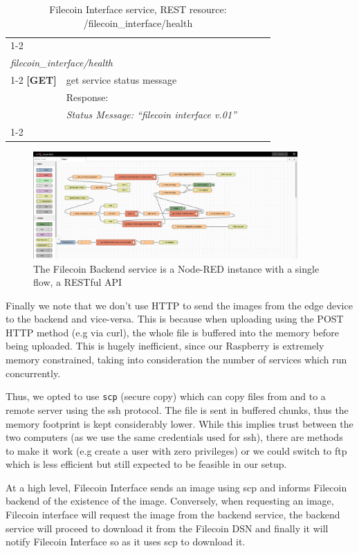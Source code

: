 \begin{table}[H]
\begin{tabular}{|l|l|lll}
\cline{1-2}
\multicolumn{2}{|l|}{{\ul }}                                            &  &  &  \\
\multicolumn{2}{|l|}{\textit{filecoin\_interface/health}}               &  &  &  \\ \cline{1-2}
\textbf{{[}GET{]}} & get service status message                         &  &  &  \\
                   & Response:                                          &  &  &  \\
                   & \textit{Status Message: “filecoin interface v.01”} &  &  &  \\ \cline{1-2}
\end{tabular}%
\caption{Filecoin Interface service, REST resource: /filecoin\_interface/health}
\end{table} %

\begin{figure}
    \centering
    \includegraphics[width=0.9\textwidth]{images/nodered_backend.png}
    \caption{The Filecoin Backend service is a Node-RED instance with a single flow, a RESTful API}
    \label{fig:filecoin_backend}
\end{figure}

Finally we note that we don’t use HTTP to send the images from the edge device to the backend and vice-versa. This is because when uploading using the POST HTTP method (e.g via curl), the whole file is buffered into the memory before being uploaded. This is hugely inefficient, since our Raspberry is extremely memory constrained, taking into consideration the number of services which run concurrently.

Thus, we opted to use \texttt{scp} (secure copy) which can copy files from and to a remote server using the ssh protocol. The file is sent in buffered chunks, thus the memory footprint is kept considerably lower. While this implies trust between the two computers (as we use the same credentials used for ssh), there are methods to make it work (e.g create a user with zero privileges) or we could switch to ftp which is less efficient but still expected to be feasible in our setup.

At a high level, Filecoin Interface sends an image using scp and informs Filecoin backend of the existence of the image. Conversely, when requesting an image, Filecoin interface will request the image from the backend service, the backend service will proceed to download it from the Filecoin DSN and finally it will notify Filecoin Interface so as it uses scp to download it.


